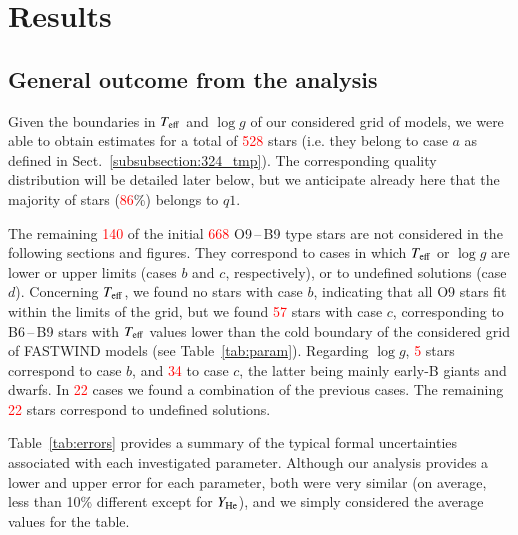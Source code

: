 \documentclass{aa}
\newcommand{\Teff}{\mbox{$T_{\rm eff}$}\xspace}
\newcommand{\logg}{\mbox{$\log g$}\xspace}
\newcommand{\He}{$Y_{\rm He}$\xspace}
\newcommand{\num}[1]{\textcolor{red}{#1}}
\begin{document}

\section{Results}
\label{section:4_tmp}




\subsection{General outcome from the analysis}
\label{subsection:41_tmp}

Given the boundaries in \Teff and \logg of our considered grid of models, we were able to obtain estimates for a total of \num{528} stars (i.e. they belong to case $a$ as defined in Sect.~\ref{subsubsection:324_tmp}). The corresponding quality distribution will be detailed later below, but we anticipate already here that the majority of stars (\num{86}\%) belongs to $q1$.

The remaining \num{140} of the initial \num{668} O9\,--\,B9 type stars are not considered in the following sections and figures. They correspond to cases in which \Teff or \logg are lower or upper limits (cases $b$ and $c$, respectively), or to undefined solutions (case $d$). Concerning \Teff, we found no stars with case $b$, indicating that all O9 stars fit within the limits of the grid, but we found \num{57} stars with case $c$, corresponding to B6\,--\,B9 stars with \Teff values lower than the cold boundary of the considered grid of {\sc FASTWIND} models (see Table~\ref{tab:param}). Regarding \logg, \num{5} stars correspond to case $b$, and \num{34} to case $c$, the latter being mainly early-B giants and dwarfs. In \num{22} cases we found a combination of the previous cases. The remaining \num{22} stars correspond to undefined solutions.

Table~\ref{tab:errors} provides a summary of the typical formal uncertainties associated with each investigated parameter. Although our analysis provides a lower and upper error for each parameter, both were very similar (on average, less than 10\% different except for \He), and we simply considered the average values for the table. 
\end{document}
